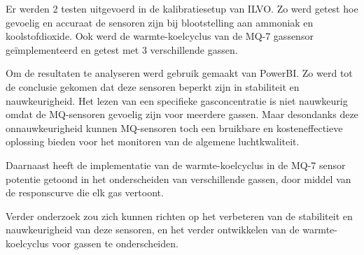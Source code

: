 Er werden 2 testen uitgevoerd in de kalibratiesetup van ILVO. Zo werd getest hoe gevoelig en accuraat de sensoren zijn bij blootstelling aan ammoniak en koolstofdioxide. Ook werd de warmte-koelcyclus van de MQ-7 gassensor geïmplementeerd en getest met 3 verschillende gassen.

Om de resultaten te analyseren werd gebruik gemaakt van PowerBI. Zo werd tot de conclusie gekomen dat deze sensoren beperkt zijn in stabiliteit en nauwkeurigheid. Het lezen van een specifieke gasconcentratie is niet nauwkeurig omdat de MQ-sensoren gevoelig zijn voor meerdere gassen. Maar desondanks deze onnauwkeurigheid kunnen MQ-sensoren toch een bruikbare en kosteneffectieve oplossing bieden voor het monitoren van de algemene luchtkwaliteit.

Daarnaast heeft de implementatie van de warmte-koelcyclus in de MQ-7 sensor potentie getoond in het onderscheiden van verschillende gassen, door middel van de responscurve die elk gas vertoont.

Verder onderzoek zou zich kunnen richten op het verbeteren van de stabiliteit en nauwkeurigheid van deze sensoren, en het verder ontwikkelen van de warmte-koelcyclus voor gassen te onderscheiden.









